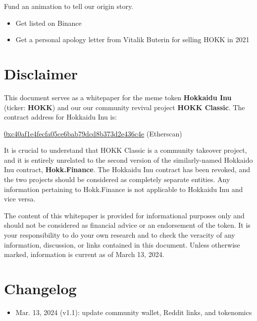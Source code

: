 \documentclass{article}
\begin{document}
\begin{tcolorbox}[colback=salmon1!10!white,colframe=salmon1,
  title=Phase 5: The King is Back,
  fonttitle=\bfseries]
  Fund an animation to tell our origin story.
\end{tcolorbox}
\begin{tcolorbox}[colback=salmon1!10!white,colframe=salmon1,
  title=Phase 6: Defeat Shiba Inu,
  fonttitle=\bfseries]
  \begin{itemize}
  \item Get listed on Binance
  \item Get a personal apology letter from Vitalik Buterin for selling HOKK in 2021
  \end{itemize}
\end{tcolorbox}

\newpage
\section{Disclaimer}
This document serves as a whitepaper for the meme token \textbf{Hokkaidu Inu} (ticker: \textbf{HOKK}) and our our community revival project \textbf{HOKK Classic}. The contract address for Hokkaidu Inu is:

\href{https://etherscan.io/token/0xc40af1e4fecfa05ce6bab79dcd8b373d2e436c4e}{0xc40af1e4fecfa05ce6bab79dcd8b373d2e436c4e} (Etherscan)

It is crucial to understand that HOKK Classic is a community takeover project, and it is entirely unrelated to the second version of the similarly-named Hokkaido Inu contract, \textbf{Hokk.Finance}. The Hokkaidu Inu contract has been revoked, and the two projects should be considered as completely separate entities. Any information pertaining to Hokk.Finance is not applicable to Hokkaidu Inu and vice versa.

The content of this whitepaper is provided for informational purposes only and should not be considered as financial advice or an endorsement of the token. It is your responsibility to do your own research and to check the veracity of any information, discussion, or links contained in this document. Unless otherwise marked, information is current as of March 13, 2024.

\section{Changelog}
\begin{itemize}
\item Mar. 13, 2024 (v1.1): update community wallet, Reddit links, and tokenomics
\end{itemize}
\end{document}
